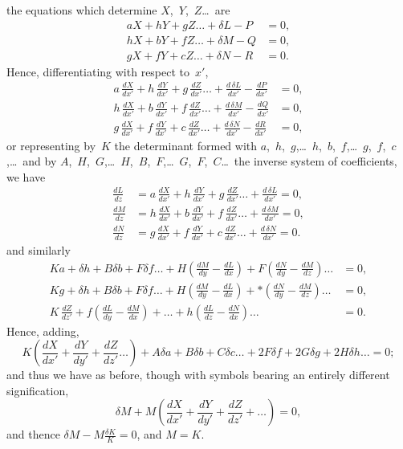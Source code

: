 \documentclass[11pt,a4paper]{article}
\begin{document}
\newpage
the equations which determine $X$,~$Y$,~$Z$\ldots\ are
\begin{align*}
aX + hY + gZ\ldots + \delta L - P &= 0,\\
hX + bY + fZ\ldots + \delta M - Q &= 0,\\
gX + fY + cZ\ldots + \delta N - R &= 0.
\end{align*}
Hence, differentiating with respect to~$x'$,
\begin{align*}
a\,\frac{dX}{dx'} + h\,\frac{dY}{dx'} + g\,\frac{dZ}{dx'}\ldots + \frac{d\,\delta L}{dx'} - \frac{dP}{dx'} &= 0,\\
h\,\frac{dX}{dx'} + b\,\frac{dY}{dx'} + f\,\frac{dZ}{dx'}\ldots + \frac{d\,\delta M}{dx'} - \frac{dQ}{dx'} &= 0,\\
g\,\frac{dX}{dx'} + f\,\frac{dY}{dx'} + c\,\frac{dZ}{dx'}\ldots + \frac{d\,\delta N}{dx'} - \frac{dR}{dx'} &= 0,
\end{align*}
or representing by~$K$ the determinant formed with $a$,~$h$,~$g$,\ldots\ $h$,~$b$,~$f$,\ldots\ $g$,~$f$,~$c$,\ldots\ and by $A$,~$H$,~$G$,\ldots\ $H$,~$B$,~$F$,\ldots\ $G$,~$F$,~$C$\ldots\ the inverse system of coefficients, we have
\begin{align*}
\frac{dL}{dz} &= a\,\frac{dX}{dx'} + h\,\frac{dY}{dx'} + g\,\frac{dZ}{dx'}\ldots + \frac{d\,\delta L}{dx'} = 0,\\
\frac{dM}{dz} &= h\,\frac{dX}{dx'} + b\,\frac{dY}{dx'} + f\,\frac{dZ}{dx'}\ldots + \frac{d\,\delta M}{dx'} = 0,\\
\frac{dN}{dz} &= g\,\frac{dX}{dx'} + f\,\frac{dY}{dx'} + c\,\frac{dZ}{dx'}\ldots + \frac{d\,\delta N}{dx'} = 0.
\end{align*}
and similarly
\begin{align*}
Ka + \delta h + B\delta b + F\delta f\ldots + H\left(\frac{dM}{dy} - \frac{dL}{dx}\right) + F\left(\frac{dN}{dy} - \frac{dM}{dz}\right)\ldots &= 0,\\
Kg + \delta h + B\delta b + F\delta f\ldots + H\left(\frac{dM}{dy} - \frac{dL}{dx}\right) + *\left(\frac{dN}{dy} - \frac{dM}{dz}\right)\ldots &= 0,\\
K\,\frac{dZ}{dz'} + f\left(\frac{dL}{dy} - \frac{dM}{dx}\right) + \ldots + h\left(\frac{dL}{dz} - \frac{dN}{dx}\right)\ldots &= 0.
\end{align*}
Hence, adding,
\[
K\left(\frac{dX}{dx'} + \frac{dY}{dy'} + \frac{dZ}{dz'}\ldots\right) + A\delta a + B\delta b + C\delta c\ldots + 2F\delta f + 2G\delta g + 2H\delta h\ldots = 0;
\]
and thus we have as before, though with symbols bearing an entirely different signification,
\[
\delta M + M\left(\frac{dX}{dx'} + \frac{dY}{dy'} + \frac{dZ}{dz'} + \ldots\right) = 0,
\]
and thence $\delta M - M\frac{\delta K}{K} = 0$, and $M = K$.
\end{document}
